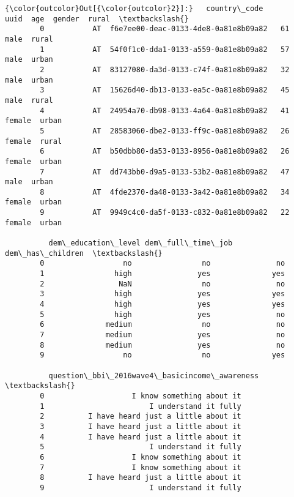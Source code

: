 \documentclass[11pt]{article}
\begin{document}
\begin{Verbatim}[commandchars=\\\{\}]
{\color{outcolor}Out[{\color{outcolor}2}]:}   country\_code                                  uuid  age  gender  rural  \textbackslash{}
        0           AT  f6e7ee00-deac-0133-4de8-0a81e8b09a82   61    male  rural   
        1           AT  54f0f1c0-dda1-0133-a559-0a81e8b09a82   57    male  urban   
        2           AT  83127080-da3d-0133-c74f-0a81e8b09a82   32    male  urban   
        3           AT  15626d40-db13-0133-ea5c-0a81e8b09a82   45    male  rural   
        4           AT  24954a70-db98-0133-4a64-0a81e8b09a82   41  female  urban   
        5           AT  28583060-dbe2-0133-ff9c-0a81e8b09a82   26  female  rural   
        6           AT  b50dbb80-da53-0133-8956-0a81e8b09a82   26  female  urban   
        7           AT  dd743bb0-d9a5-0133-53b2-0a81e8b09a82   47    male  urban   
        8           AT  4fde2370-da48-0133-3a42-0a81e8b09a82   34  female  urban   
        9           AT  9949c4c0-da5f-0133-c832-0a81e8b09a82   22  female  urban   
        
          dem\_education\_level dem\_full\_time\_job dem\_has\_children  \textbackslash{}
        0                  no                no               no   
        1                high               yes              yes   
        2                 NaN                no               no   
        3                high               yes              yes   
        4                high               yes              yes   
        5                high               yes               no   
        6              medium                no               no   
        7              medium               yes               no   
        8              medium               yes               no   
        9                  no                no              yes   
        
          question\_bbi\_2016wave4\_basicincome\_awareness  \textbackslash{}
        0                    I know something about it   
        1                        I understand it fully   
        2          I have heard just a little about it   
        3          I have heard just a little about it   
        4          I have heard just a little about it   
        5                        I understand it fully   
        6                    I know something about it   
        7                    I know something about it   
        8          I have heard just a little about it   
        9                        I understand it fully   
        

\end{Verbatim}
\end{document}
